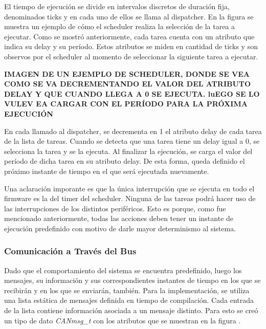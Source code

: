 El tiempo de ejecución se divide en intervalos discretos de duración fija, denominados ticks y en cada uno de ellos se llama al dispatcher. En la figura  se muestra un ejemplo de cómo el scheduler realiza la selección de la tarea a ejecutar. Como se mostró anteriormente, cada tarea cuenta con un atributo que indica su delay y su período. Estos atributos se miden en cantidad de ticks y son observos por el scheduler al momento de seleccionar la siguiente tarea a ejecutar.

{\Large \textbf{{\color{red} IMAGEN DE UN EJEMPLO DE SCHEDULER, DONDE SE VEA COMO SE VA DECREMENTANDO EL VALOR DEL ATRIBUTO DELAY Y QUE CUANDO LLEGA A 0 SE EJECUTA. luEGO SE LO VULEV EA CARGAR CON EL PERÍODO PARA LA PRÓXIMA EJECUCIÓN}}}

En cada llamado al dispatcher, se decrementa en 1 el atributo delay de cada tarea de la lista de tareas. Cuando se detecta que una tarea tiene un delay igual a 0, se selecciona la tarea y se la ejecuta. Al finalizar la ejecución, se carga el valor del período de dicha tarea en su atributo delay. De esta forma, queda definido el próximo instante de tiempo en el que será ejecutada nuevamente.

Una aclaración imporante es que la única interrupción que se ejecuta en todo el firmware es la del timer del scheduler. Ninguna de las tareas podrá hacer uso de las interrupciones de los distintos periféricos. Esto es porque, como fue mencionado anteriormente, todas las acciones deben tener un instante de ejecución predefinido con motivo de darle mayor determinismo al sistema.

\subsubsection{Comunicación a Través del Bus}


Dado que el comportamiento del sistema se encuentra predefinido, luego los mensajes, su información y sus correspondientes instantes de tiempo en los que se recibirán y en los que se enviarán, también. Para la implementación, se utiliza una lista estática de mensajes definida en tiempo de compilación. Cada entrada de la lista contiene información asociada a un mensaje distinto. Para esto se creó un tipo de dato \textit{CANmsg\_t} con los atributos que se muestran en la figura .

